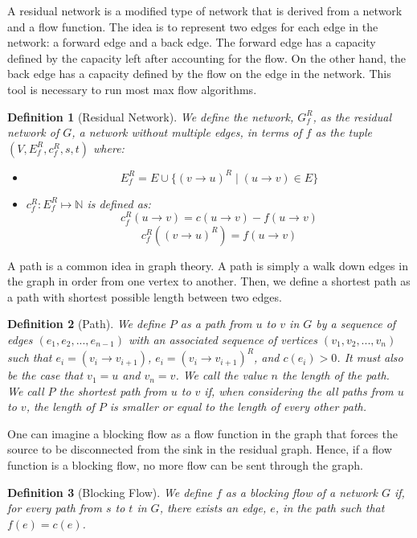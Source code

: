 \documentclass{report}
\newtheorem{definition}{Definition}[section]
\begin{document}
A residual network is a modified type of network that is derived from a network and a flow function. The idea is to represent two edges for each edge in the network: a forward edge and a back edge. The forward edge has a capacity defined by the capacity left after accounting for the flow. On the other hand, the back edge has a capacity defined by the flow on the edge in the network. This tool is necessary to run most max flow algorithms.
\begin{definition}[Residual Network]
    We define the network, $G_f^R$, as the residual network of $G$, a network without multiple edges, in terms of $f$ as the tuple $(V, E_f^R, c_f^R, s, t)$ where:
    \begin{itemize}
        \item
            $$E_f^R = E \cup \{(v \rightarrow u)^R \mid (u \rightarrow v) \in E\}$$
        \item
            $c_f^R : E_f^R \mapsto \mathbb{N}$ is defined as:
            $$c_f^R(u \rightarrow v) = c(u \rightarrow v) - f(u \rightarrow v)$$
            $$c_f^R((v \rightarrow u)^R) = f(u \rightarrow v)$$
    \end{itemize}
\end{definition}

A path is a common idea in graph theory. A path is simply a walk down edges in the graph in order from one vertex to another. Then, we define a shortest path as a path with shortest possible length between two edges.
\begin{definition}[Path]
    We define $P$ as a path from $u$ to $v$ in $G$ by a sequence of edges $(e_1, e_2, ..., e_{n-1})$ with an associated sequence of vertices $(v_1, v_2, ..., v_n)$ such that $e_i = (v_i \rightarrow v_{i+1})$, $e_i = (v_i \rightarrow v_{i+1})^R$, and $c(e_i) > 0$. It must also be the case that $v_1 = u$ and $v_n = v$. We call the value $n$ the length of the path.\\
    We call $P$ the shortest path from $u$ to $v$ if, when considering the all paths from $u$ to $v$, the length of $P$ is smaller or equal to the length of every other path.
\end{definition}

One can imagine a blocking flow as a flow function in the graph that forces the source to be disconnected from the sink in the residual graph. Hence, if a flow function is a blocking flow, no more flow can be sent through the graph.
\begin{definition}[Blocking Flow]
    We define $f$ as a blocking flow of a network $G$ if, for every path from $s$ to $t$ in $G$, there exists an edge, $e$, in the path such that $f(e) = c(e)$.
\end{definition}
\end{document}
